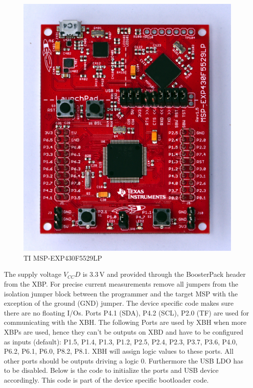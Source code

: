 \documentclass[twoside,11pt]{cergdoc}
\begin{document}
\begin{figure}[ht]
  \begin{center}
    \includegraphics[scale=0.6]{figures/msp-exp430f5529lp}
    \caption{TI MSP-EXP430F5529LP}\label{fig:5529}
  \end{center}
\vspace{-1ex}
\end{figure}

\noindent The supply voltage $V_{CC}D$ is 3.3\,V and provided through the BoosterPack header 
from the XBP.
For precise current measurements remove all jumpers from the isolation jumper block 
between the programmer and the target MSP with the exception of the ground (GND) jumper. 
The device specific code makes sure there are no floating I/Os. 
Ports P4.1 (SDA), P4.2 (SCL), P2.0 (TF) are used for communicating with the XBH.
The following Ports are used by XBH when more XBPs are used, hence they can't be outputs on XBD
and have to be configured as inputs (default): 
P1.5, P1.4, P1.3, P1.2, 
P2.5, P2.4, P2.3, 
P3.7, P3.6, 
P4.0, 
P6.2, P6.1, P6.0, 
P8.2, P8.1. 
XBH will assign logic values to these ports.
All other ports should be outputs driving a logic 0. 
Furthermore the USB LDO has to be disabled.
Below is the code to initialize the ports and USB device
accordingly. 
This code is part of the device specific bootloader code.
\end{document}
